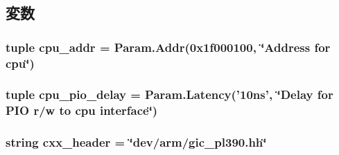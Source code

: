 \subsection{変数}
\hypertarget{classGic_1_1Pl390_af57b28a831d4a9c3c6789aa9a054a505}{
\subsubsection[{cpu\_\-addr}]{\setlength{\rightskip}{0pt plus 5cm}tuple {\bf cpu\_\-addr} = {\bf Param.Addr}(0x1f000100, \char`\"{}Address for cpu\char`\"{})}}
\label{classGic_1_1Pl390_af57b28a831d4a9c3c6789aa9a054a505}
\hypertarget{classGic_1_1Pl390_a3075916c22552db954366fdad798c74c}{
\subsubsection[{cpu\_\-pio\_\-delay}]{\setlength{\rightskip}{0pt plus 5cm}tuple {\bf cpu\_\-pio\_\-delay} = Param.Latency('10ns', \char`\"{}Delay for PIO r/w to cpu interface\char`\"{})}}
\label{classGic_1_1Pl390_a3075916c22552db954366fdad798c74c}
\hypertarget{classGic_1_1Pl390_a17da7064bc5c518791f0c891eff05fda}{
\subsubsection[{cxx\_\-header}]{\setlength{\rightskip}{0pt plus 5cm}string {\bf cxx\_\-header} = \char`\"{}dev/arm/gic\_\-pl390.hh\char`\"{}}}
\label{classGic_1_1Pl390_a17da7064bc5c518791f0c891eff05fda}


